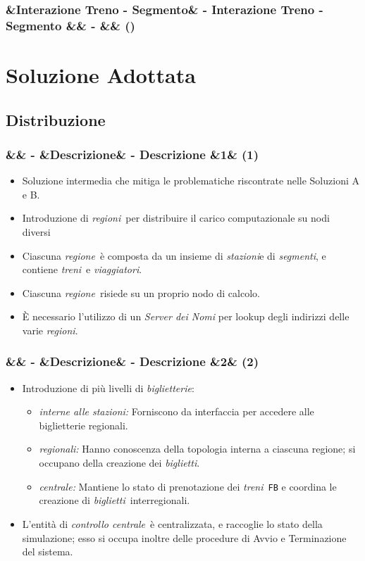 \documentclass[slidestop,compress,blackandwhite]{beamer}
\newcommand{\ttt}[1]{\texttt{#1}}
\newcommand{\ii}[1]{\textit{#1}}
\newcommand{\treni}{\ii{treni}}
\newcommand{\viaggiatori}{\ii{viaggiatori}}
\newcommand{\stazioni}{\ii{stazioni}}
\newcommand{\tickets}{\ii{biglietti}}
\newcommand{\segmenti}{\ii{segmenti}}
\newcommand{\biglietterie}{\ii{biglietterie}}
\newcommand{\controller}{\ii{controllo centrale}}
\newcommand{\regione}{\ii{regione}}
\newcommand{\regioni}{\ii{regioni}}
\newcommand{\newtitle}[4]{
	#1 
	\ifx&#2&%
	\else
  		\large- #2
	\fi
	\ifx&#3&%
	\else
  		\normalsize- #3
	\fi
	\ifx&#4&%
	\else
  		\normalsize (#4)
	\fi
}
\newcommand{\newframe}[5]{
	\begin{frame}
		\frametitle{\newtitle{#1}{#2}{#3}{#4}}
		#5
	\end{frame}
}
\newcommand{\myitemize}[1]{\begin{itemize}#1\end{itemize}}
\begin{document}
	\newframe{}{Interazione Treno - Segmento}{}{}{
	
		
		
	}
	

\section{Soluzione Adottata}\label{sol}
	
	\subsection{Distribuzione}\label{sol_distr}
	
	\newframe{}{}{Descrizione}{1}{
		\vspace{0.5cm}
		\begin{itemize}
			\item Soluzione intermedia che mitiga le problematiche riscontrate nelle Soluzioni A e B.
			\item Introduzione di \regioni~per distribuire il carico computazionale su nodi diversi
			\item Ciascuna \regione~è composta da un insieme di \stazioni e di \segmenti, e contiene \treni~e \viaggiatori.
			\item Ciascuna \regione~risiede su un proprio nodo di calcolo.
			\item \`E necessario l'utilizzo di un \ii{Server dei Nomi} per lookup degli indirizzi delle varie \regioni.
		\end{itemize}
	
	}
	
	\newframe{}{}{Descrizione}{2}{
		\vspace{0.5cm}
		\myitemize{
			\item Introduzione di più livelli di \biglietterie:
				\myitemize{
					\item \ii{interne alle stazioni:} Forniscono da interfaccia per accedere alle biglietterie regionali.
					\item \ii{regionali:} Hanno conoscenza della topologia interna a ciascuna regione; si occupano della creazione dei \tickets.
					\item \ii{centrale:} Mantiene lo stato di prenotazione dei \treni~\ttt{FB} e coordina le creazione di \tickets~interregionali.
				}
			\item L'entità di \controller~è centralizzata, e raccoglie lo stato della simulazione; esso si occupa inoltre delle procedure di Avvio e Terminazione del sistema.
		}
	}
	
\end{document}
